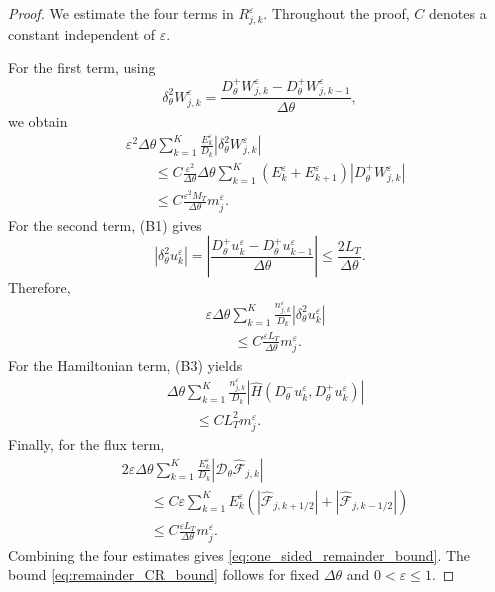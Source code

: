 \documentclass[11pt, dina4, amsfont12]{article}
\begin{document}
\begin{proof}
We estimate the four terms in \(R_{j,k}^\varepsilon\). Throughout the proof,
\(C\) denotes a constant independent of \(\varepsilon\).

For the first term, using
\[
    \delta_\theta^2W_{j,k}^\varepsilon
    =
    \frac{
        D_\theta^+W_{j,k}^\varepsilon
        -
        D_\theta^+W_{j,k-1}^\varepsilon
    }{\Delta\theta},
\]
we obtain
\[
\begin{aligned}
&
\varepsilon^2
\Delta\theta
\sum_{k=1}^K
\frac{E_k^\varepsilon}{D_k}
\left|
\delta_\theta^2W_{j,k}^\varepsilon
\right|
\\
&\qquad
\le
C
\frac{\varepsilon^2}{\Delta\theta}
\Delta\theta
\sum_{k=1}^K
\left(
    E_k^\varepsilon+E_{k+1}^\varepsilon
\right)
\left|
D_\theta^+W_{j,k}^\varepsilon
\right|
\\
&\qquad
\le
C
\frac{\varepsilon^2M_T}{\Delta\theta}
m_j^\varepsilon .
\end{aligned}
\]
For the second term, (B1) gives
\[
    |\delta_\theta^2u_k^\varepsilon|
    =
    \left|
    \frac{
        D_\theta^+u_k^\varepsilon
        -
        D_\theta^+u_{k-1}^\varepsilon
    }{\Delta\theta}
    \right|
    \le
    \frac{2L_T}{\Delta\theta}.
\]
Therefore,
\[
\begin{aligned}
&
\varepsilon
\Delta\theta
\sum_{k=1}^K
\frac{n_{j,k}^\varepsilon}{D_k}
\left|
\delta_\theta^2u_k^\varepsilon
\right|
\\
&\qquad
\le
C
\frac{\varepsilon L_T}{\Delta\theta}
m_j^\varepsilon .
\end{aligned}
\]
For the Hamiltonian term, (B3) yields
\[
\begin{aligned}
&
\Delta\theta
\sum_{k=1}^K
\frac{n_{j,k}^\varepsilon}{D_k}
\left|
\widehat H
\left(
    D_\theta^-u_k^\varepsilon,
    D_\theta^+u_k^\varepsilon
\right)
\right|
\\
&\qquad
\le
C L_T^2 m_j^\varepsilon .
\end{aligned}
\]
Finally, for the flux term,
\[
\begin{aligned}
&
2\varepsilon
\Delta\theta
\sum_{k=1}^K
\frac{E_k^\varepsilon}{D_k}
\left|
\mathcal D_\theta
\widehat{\mathcal F}_{j,k}
\right|
\\
&\qquad
\le
C\varepsilon
\sum_{k=1}^K
E_k^\varepsilon
\left(
    |\widehat{\mathcal F}_{j,k+1/2}|
    +
    |\widehat{\mathcal F}_{j,k-1/2}|
\right)
\\
&\qquad
\le
C
\frac{\varepsilon L_T}{\Delta\theta}
m_j^\varepsilon .
\end{aligned}
\]
Combining the four estimates gives \eqref{eq:one_sided_remainder_bound}.
The bound \eqref{eq:remainder_CR_bound} follows for fixed
\(\Delta\theta\) and \(0<\varepsilon\le1\).
\end{proof}
\end{document}
